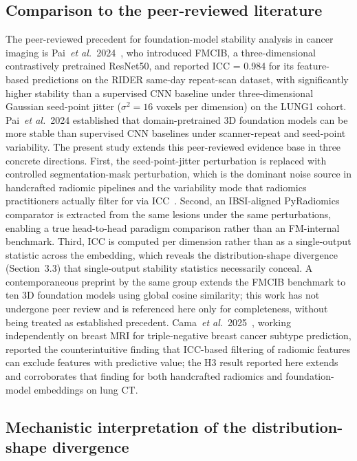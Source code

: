 \subsection{Comparison to the peer-reviewed literature}

The peer-reviewed precedent for foundation-model stability analysis in cancer imaging is Pai~\textit{et al.}~2024~\cite{pai2024}, who introduced FMCIB, a three-dimensional contrastively pretrained ResNet50, and reported ICC = 0.984 for its feature-based predictions on the RIDER same-day repeat-scan dataset, with significantly higher stability than a supervised CNN baseline under three-dimensional Gaussian seed-point jitter ($\sigma^2 = 16$ voxels per dimension) on the LUNG1 cohort. Pai~\textit{et al.}~2024 established that domain-pretrained 3D foundation models can be more stable than supervised CNN baselines under scanner-repeat and seed-point variability. The present study extends this peer-reviewed evidence base in three concrete directions. First, the seed-point-jitter perturbation is replaced with controlled segmentation-mask perturbation, which is the dominant noise source in handcrafted radiomic pipelines and the variability mode that radiomics practitioners actually filter for via ICC~\cite{pavic2018,vantimmeren2020}. Second, an IBSI-aligned PyRadiomics comparator is extracted from the same lesions under the same perturbations, enabling a true head-to-head paradigm comparison rather than an FM-internal benchmark. Third, ICC is computed per dimension rather than as a single-output statistic across the embedding, which reveals the distribution-shape divergence (Section~3.3) that single-output stability statistics necessarily conceal. A contemporaneous preprint by the same group extends the FMCIB benchmark to ten 3D foundation models using global cosine similarity; this work has not undergone peer review and is referenced here only for completeness, without being treated as established precedent. Cama~\textit{et al.}~2025~\cite{cama2025}, working independently on breast MRI for triple-negative breast cancer subtype prediction, reported the counterintuitive finding that ICC-based filtering of radiomic features can exclude features with predictive value; the H3 result reported here extends and corroborates that finding for both handcrafted radiomics and foundation-model embeddings on lung CT.

\subsection{Mechanistic interpretation of the distribution-shape divergence}

